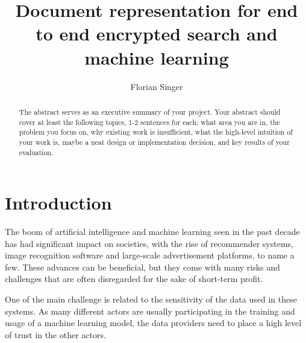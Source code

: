 \documentclass[a4paper,11pt,oneside]{report}
\title{Document representation for end to end encrypted search and machine learning}
\author{Florian Singer}
\begin{document}
\maketitle

\begin{abstract}
The abstract serves as an executive summary of your project.
Your abstract should cover at least the following topics, 1-2 sentences for
each: what area you are in, the problem you focus on, why existing work is
insufficient, what the high-level intuition of your work is, maybe a neat
design or implementation decision, and key results of your evaluation.
\end{abstract}

\maketoc


\chapter{Introduction}



The boom of artificial intelligence and machine learning seen in the past decade has had significant impact on societies, with the rise of recommender systems, image recognition software and large-scale advertisement platforms, to name a few. These advances can be beneficial, but they come with many risks and challenges that are often disregarded for the sake of short-term profit.

One of the main challenge is related to the sensitivity of the data used in these systems. As many different actors are usually participating in the training and usage of a machine learning model, the data providers need to place a high level of trust in the other actors.
\end{document}

